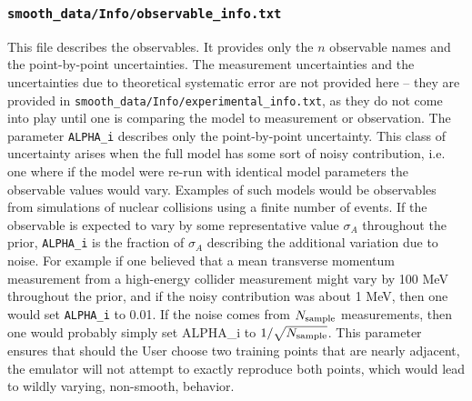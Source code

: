 \documentclass[UserManual.tex]{subfiles}
\begin{document}
\begin{sloppypar}
\subsubsection{{\tt smooth\_data/Info/observable\_info.txt}}
This file describes the observables. It provides only the $n$ observable names and the point-by-point uncertainties.
\vspace*{-8pt}{\tt \begin{Verbatim}[commandchars=\\\{\}]
observable_name_1   ALPHA_1
observable_name_2   ALPHA_1
   .
observable_name_n   ALPHA_N
\end{Verbatim}
}\vspace*{-8pt}
The measurement uncertainties and the uncertainties due to theoretical systematic error are not provided here -- they are provided in {\tt smooth\_data/Info/experimental\_info.txt}, as they do not come into play until one is comparing the model to measurement or observation. The parameter {\tt ALPHA\_i} describes only the point-by-point uncertainty. This class of uncertainty arises when the full model has some sort of noisy contribution, i.e. one where if the model were re-run with identical model parameters the observable values would vary. Examples of such models would be observables from simulations of nuclear collisions using a finite number of events. If the observable is expected to vary by some representative value $\sigma_A$ throughout the prior, {\tt ALPHA\_i} is the fraction of $\sigma_A$ describing the additional variation due to noise. For example if one believed that a mean transverse momentum measurement from a high-energy collider measurement might vary by 100 MeV throughout the prior, and if the noisy contribution was about 1 MeV, then one would set {\tt ALPHA\_i} to 0.01. If the noise comes from $N_{\rm sample}$ measurements, then one would probably simply set {ALPHA\_i} to $1/\sqrt{N_{\rm sample}}$. This parameter ensures that should the User choose two training points that are nearly adjacent, the emulator will not attempt to exactly reproduce both points, which would lead to wildly varying, non-smooth, behavior.


\end{sloppypar}
\end{document}
